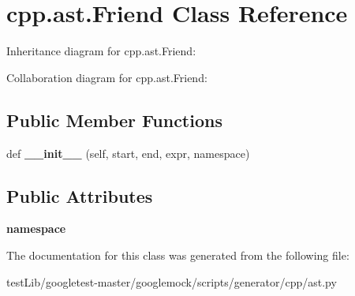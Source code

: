\hypertarget{classcpp_1_1ast_1_1Friend}{}\section{cpp.\+ast.\+Friend Class Reference}
\label{classcpp_1_1ast_1_1Friend}


Inheritance diagram for cpp.\+ast.\+Friend\+:


Collaboration diagram for cpp.\+ast.\+Friend\+:
\subsection*{Public Member Functions}
\begin{DoxyCompactItemize}
\item 
\mbox{\label{classcpp_1_1ast_1_1Friend_a9fe245d0f14eaab85435e942a56de7e6}} 
def {\bfseries \+\_\+\+\_\+init\+\_\+\+\_\+} (self, start, end, expr, namespace)
\end{DoxyCompactItemize}
\subsection*{Public Attributes}
\begin{DoxyCompactItemize}
\item 
\mbox{\label{classcpp_1_1ast_1_1Friend_a076c68dddae9bd1e24d224d005538014}} 
{\bfseries namespace}
\end{DoxyCompactItemize}


The documentation for this class was generated from the following file\+:\begin{DoxyCompactItemize}
\item 
test\+Lib/googletest-\/master/googlemock/scripts/generator/cpp/ast.\+py\end{DoxyCompactItemize}
